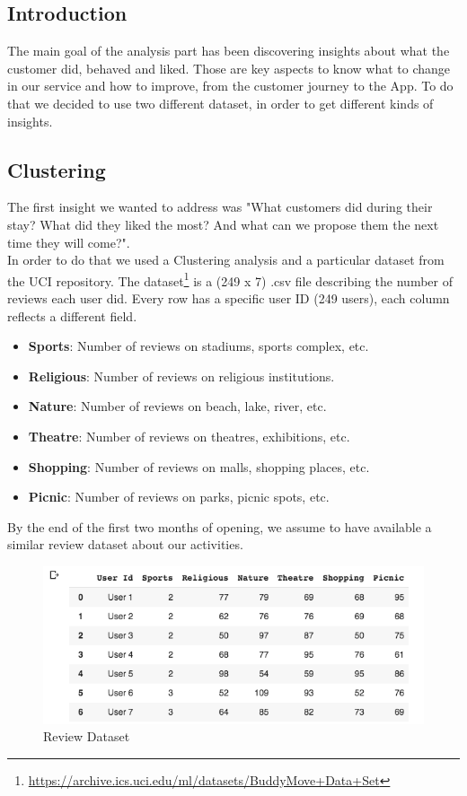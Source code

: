 \subsection{Introduction}
The main goal of the analysis part has been discovering insights about what the customer did, behaved and liked. Those are key aspects to know what to change in our service and how to improve, from the customer journey to the App. 
To do that we decided to use two different dataset, in order to get different kinds of insights.

\subsection{Clustering}
The first insight we wanted to address was "What customers did during their stay? What did they liked the most? And what can we propose them the next time they will come?".\\
In order to do that we used a Clustering analysis and a particular dataset from the UCI repository. The dataset\footnote{\url{https://archive.ics.uci.edu/ml/datasets/BuddyMove+Data+Set}} is a (249 x 7) .csv file describing the number of reviews each user did. Every row has a specific user ID (249 users), each column reflects  a different field.

\begin{itemize}
\item \textbf{Sports}: Number of reviews on stadiums, sports complex, etc.
\item \textbf{Religious}: Number of reviews on religious institutions.
\item \textbf{Nature}: Number of reviews on beach, lake, river, etc.
\item \textbf{Theatre}: Number of reviews on theatres, exhibitions, etc.
\item \textbf{Shopping}: Number of reviews on malls, shopping places, etc.
\item \textbf{Picnic}: Number of reviews on parks, picnic spots, etc.
\end{itemize}
\noindent By the end of the first two months of opening, we assume to have available a similar review dataset about our activities.

\begin{figure}[H]
\centering
\includegraphics[width=1\textwidth]{Img/Review_dataset.png}
\caption{Review Dataset}
\end{figure}

